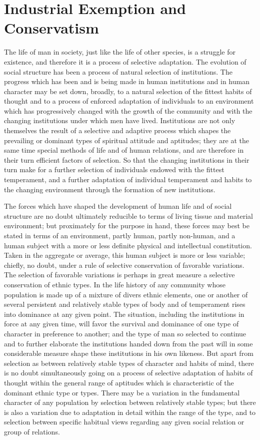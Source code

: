 \documentclass[12pt]{report}
\begin{document}
\chapter{Industrial Exemption and Conservatism}

The life of man in society, just like the life of other species, is
a struggle for existence, and therefore it is a process of selective
adaptation. The evolution of social structure has been a process of
natural selection of institutions. The progress which has been and is
being made in human institutions and in human character may be set down,
broadly, to a natural selection of the fittest habits of thought and to
a process of enforced adaptation of individuals to an environment which
has progressively changed with the growth of the community and with the
changing institutions under which men have lived. Institutions are not
only themselves the result of a selective and adaptive process which
shapes the prevailing or dominant types of spiritual attitude and
aptitudes; they are at the same time special methods of life and of
human relations, and are therefore in their turn efficient factors of
selection. So that the changing institutions in their turn make for a
further selection of individuals endowed with the fittest temperament,
and a further adaptation of individual temperament and habits to the
changing environment through the formation of new institutions.

The forces which have shaped the development of human life and of social
structure are no doubt ultimately reducible to terms of living tissue
and material environment; but proximately for the purpose in hand, these
forces may best be stated in terms of an environment, partly human,
partly non-human, and a human subject with a more or less definite
physical and intellectual constitution. Taken in the aggregate or
average, this human subject is more or less variable; chiefly, no doubt,
under a rule of selective conservation of favorable variations.
The selection of favorable variations is perhaps in great measure a
selective conservation of ethnic types. In the life history of any
community whose population is made up of a mixture of divers ethnic
elements, one or another of several persistent and relatively stable
types of body and of temperament rises into dominance at any given
point. The situation, including the institutions in force at any given
time, will favor the survival and dominance of one type of character in
preference to another; and the type of man so selected to continue and
to further elaborate the institutions handed down from the past will in
some considerable measure shape these institutions in his own likeness.
But apart from selection as between relatively stable types of character
and habits of mind, there is no doubt simultaneously going on a process
of selective adaptation of habits of thought within the general range of
aptitudes which is characteristic of the dominant ethnic type or types.
There may be a variation in the fundamental character of any population
by selection between relatively stable types; but there is also a
variation due to adaptation in detail within the range of the type, and
to selection between specific habitual views regarding any given social
relation or group of relations.
\end{document}
